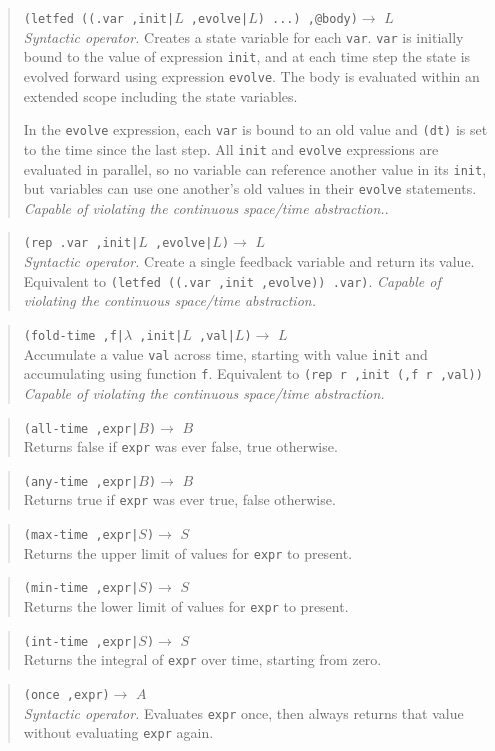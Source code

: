 \documentclass{article}
\newcommand\violation{{\em Capable of violating the continuous
    space/time abstraction.}}
\newcommand\function[3]
{\begin{quote}{\tt #1}$\rightarrow$ \type{#2} \\ #3 \end{quote}}
\newcommand\syntactic[3]
{\function{#1}{#2}{{\em Syntactic operator.} #3}}
\newcommand\type[1]{$#1$}
\newcommand\var[1]{{\tt #1}}
\begin{document}
\syntactic{(letfed ((.var ,init|\type{L} ,evolve|\type{L}) ...)
  ,@body)}{L} {Creates a state variable for each \var{var}.  \var{var}
  is initially bound to the value of expression \var{init}, and at
  each time step the state is evolved forward using expression
  \var{evolve}.  The body is evaluated within an extended scope
  including the state variables.
  
  In the \var{evolve} expression, each \var{var} is bound to an old
  value and \var{(dt)} is set to the time since the last step.
  All \var{init} and \var{evolve} expressions are evaluated in
  parallel, so no variable can reference another value in its
  \var{init}, but variables can use one another's old values in their
  \var{evolve} statements.  \violation{}.}

\syntactic{(rep .var ,init|\type{L} ,evolve|\type{L})}{L}{Create
  a single feedback variable and return its value.  Equivalent to
  \var{(letfed ((.var ,init ,evolve)) .var)}.  \violation{}}

\function{(fold-time ,f|\type{\lambda} ,init|\type{L}
  ,val|\type{L})}{L}{Accumulate a value \var{val} across time,
  starting with value \var{init} and accumulating using function
  \var{f}.  Equivalent to \var{(rep r ,init (,f r ,val))}
  \violation{}}

\function{(all-time ,expr|\type{B})}{B}{Returns false if \var{expr}
  was ever false, true otherwise.}

\function{(any-time ,expr|\type{B})}{B}{Returns true if \var{expr} was
  ever true, false otherwise.}

\function{(max-time ,expr|\type{S})}{S}{Returns the upper limit of
  values for \var{expr} to present.}

\function{(min-time ,expr|\type{S})}{S}{Returns the lower limit of
  values for \var{expr} to present.}

\function{(int-time ,expr|\type{S})}{S}{Returns the integral of \var{expr}
  over time, starting from zero.}

\syntactic{(once ,expr)}{A}{Evaluates \var{expr} once, then always returns
  that value without evaluating \var{expr} again.}
\end{document}
